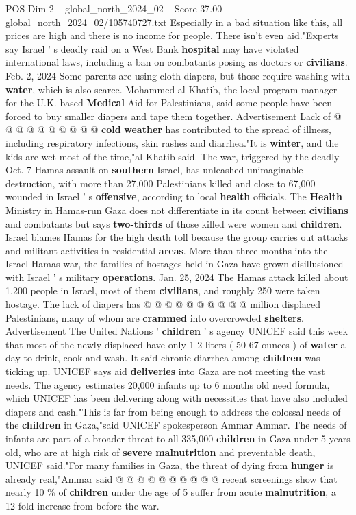 \begin{textsample}{POS Dim 2 – global\_north\_2024\_02 – Score 37.00 – global\_north\_2024\_02/105740727.txt}
Especially in a bad situation like this, all prices are high and there is no income for people.
There isn't even aid."Experts say Israel ' s deadly raid on a West Bank \textbf{hospital} may have violated international laws, including a ban on combatants posing as doctors or \textbf{civilians}.
Feb. 2, 2024 Some parents are using cloth diapers, but those require washing with \textbf{water}, which is also scarce.
Mohammed al Khatib, the local program manager for the U.K.-based \textbf{Medical} Aid for Palestinians, said some people have been forced to buy smaller diapers and tape them together.
Advertisement Lack of @ @ @ @ @ @ @ @ @ @ \textbf{cold} \textbf{weather} has contributed to the spread of illness, including respiratory infections, skin rashes and diarrhea."It is \textbf{winter}, and the kids are wet most of the time,"al-Khatib said.
The war, triggered by the deadly Oct. 7 Hamas assault on \textbf{southern} Israel, has unleashed unimaginable destruction, with more than 27,000 Palestinians killed and close to 67,000 wounded in Israel ' s \textbf{offensive}, according to local \textbf{health} officials.
The \textbf{Health} Ministry in Hamas-run Gaza does not differentiate in its count between \textbf{civilians} and combatants but says \textbf{two-thirds} of those killed were women and \textbf{children}.
Israel blames Hamas for the high death toll because the group carries out attacks and militant activities in residential \textbf{areas}.
More than three months into the Israel-Hamas war, the families of hostages held in Gaza have grown disillusioned with Israel ' s military \textbf{operations}.
Jan. 25, 2024 The Hamas attack killed about 1,200 people in Israel, most of them \textbf{civilians}, and roughly 250 were taken hostage.
The lack of diapers has @ @ @ @ @ @ @ @ @ @ million displaced Palestinians, many of whom are \textbf{crammed} into overcrowded \textbf{shelters}.
Advertisement The United Nations ' \textbf{children} ' s agency UNICEF said this week that most of the newly displaced have only 1-2 liters ( 50-67 ounces ) of \textbf{water} a day to drink, cook and wash.
It said chronic diarrhea among \textbf{children} was ticking up.
UNICEF says aid \textbf{deliveries} into Gaza are not meeting the vast needs.
The agency estimates 20,000 infants up to 6 months old need formula, which UNICEF has been delivering along with necessities that have also included diapers and cash."This is far from being enough to address the colossal needs of the \textbf{children} in Gaza,"said UNICEF spokesperson Ammar Ammar.
The needs of infants are part of a broader threat to all 335,000 \textbf{children} in Gaza under 5 years old, who are at high risk of \textbf{severe} \textbf{malnutrition} and preventable death, UNICEF said."For many families in Gaza, the threat of dying from \textbf{hunger} is already real,"Ammar said @ @ @ @ @ @ @ @ @ @ recent screenings show that nearly 10 \% of \textbf{children} under the age of 5 suffer from acute \textbf{malnutrition}, a 12-fold increase from before the war.

\end{textsample}
